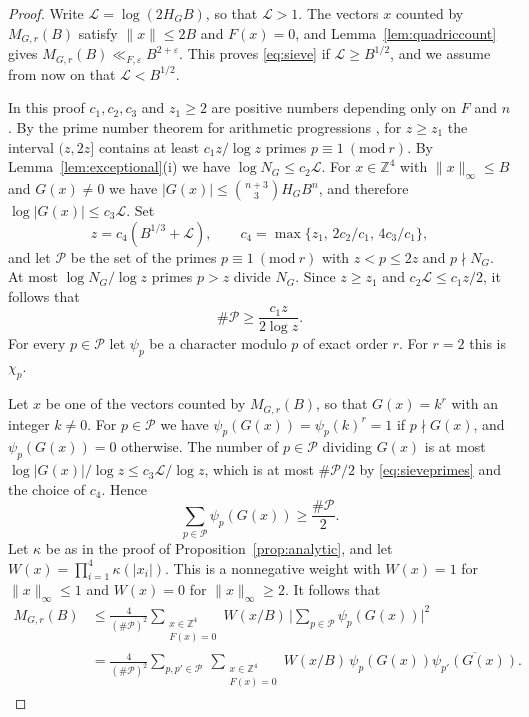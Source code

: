 \documentclass[11pt]{amsart}
\numberwithin{equation}{section}
\numberwithin{figure}{section}
\theoremstyle{definition}
\newcommand{\Z}{\mathbb{Z}}
\newcommand{\F}{\mathcal{F}}
\newcommand{\imod}[1]{\ (\mathrm{mod}\ #1)}
\newcommand{\eps}{\varepsilon}
\newcommand{\abs}[1]{\lvert #1\rvert}
\begin{document}
\begin{proof}
Write $\mathcal L=\log(2H_GB)$, so that $\mathcal L>1$. The vectors
$x$ counted by $M_{G,r}(B)$ satisfy $\lVert x\rVert\le2B$ and
$F(x)=0$, and Lemma~\ref{lem:quadriccount} gives
$M_{G,r}(B)\ll_{F,\eps}B^{2+\eps}$. This proves \eqref{eq:sieve} if
$\mathcal L\ge B^{1/2}$, and we assume from now on that
$\mathcal L<B^{1/2}$.

In this proof $c_1,c_2,c_3$ and $z_1\ge2$ are positive numbers
depending only on $F$ and $n$. By the prime number theorem for arithmetic
progressions \cite[Corollary~11.21]{MV}, for $z\ge z_1$ the interval
$(z,2z]$ contains at least $c_1z/\log z$ primes $p\equiv1\imod r$. By
Lemma~\ref{lem:exceptional}(i) we have $\log N_G\le c_2\mathcal L$.
For $x\in\Z^4$ with $\lVert x\rVert_\infty\le B$ and $G(x)\ne0$ we
have $\abs{G(x)}\le\binom{n+3}3H_GB^n$, and therefore
$\log\abs{G(x)}\le c_3\mathcal L$. Set
\[
 z=c_4(B^{1/3}+\mathcal L),\qquad
 c_4=\max\{z_1,\,2c_2/c_1,\,4c_3/c_1\},
\]
and let $\mathcal P$ be the set of the primes $p\equiv1\imod r$ with
$z<p\le2z$ and $p\nmid N_G$. At most $\log N_G/\log z$ primes $p>z$
divide $N_G$. Since $z\ge z_1$ and $c_2\mathcal L\le c_1z/2$, it
follows that
\begin{equation}\label{eq:sieveprimes}
 \#\mathcal P\ge\frac{c_1z}{2\log z}.
\end{equation}
For every $p\in\mathcal P$ let $\psi_p$ be a character modulo $p$ of
exact order $r$. For $r=2$ this is $\chi_p$.

Let $x$ be one of the vectors counted by $M_{G,r}(B)$, so that
$G(x)=k^r$ with an integer $k\ne0$. For $p\in\mathcal P$ we have
$\psi_p(G(x))=\psi_p(k)^r=1$ if $p\nmid G(x)$, and $\psi_p(G(x))=0$
otherwise. The number of $p\in\mathcal P$ dividing $G(x)$ is at most
$\log\abs{G(x)}/\log z\le c_3\mathcal L/\log z$, which is at most
$\#\mathcal P/2$ by \eqref{eq:sieveprimes} and the choice of $c_4$.
Hence
\[
 \sum_{p\in\mathcal P}\psi_p(G(x))\ge\frac{\#\mathcal P}2.
\]
Let $\kappa$ be as in the proof of
Proposition~\ref{prop:analytic}, and let
$W(x)=\prod_{i=1}^4\kappa(\abs{x_i})$. This is a nonnegative weight
with $W(x)=1$ for $\lVert x\rVert_\infty\le1$ and $W(x)=0$ for
$\lVert x\rVert_\infty\ge2$. It follows that
\begin{equation}\label{eq:sieveineq}
\begin{aligned}
 M_{G,r}(B)&\le\frac4{(\#\mathcal P)^2}
 \sum_{\substack{x\in\Z^4\\F(x)=0}}W(x/B)\,
 \bigg|\sum_{p\in\mathcal P}\psi_p(G(x))\bigg|^2\\
 &=\frac4{(\#\mathcal P)^2}\sum_{p,p'\in\mathcal P}\
 \sum_{\substack{x\in\Z^4\\F(x)=0}}W(x/B)\,
 \psi_p(G(x))\overline{\psi_{p'}(G(x))}.
\end{aligned}
\end{equation}


\end{proof}
\end{document}
